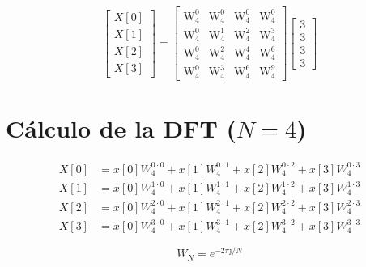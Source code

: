 \documentclass[12pt]{article}
\begin{document}
$$
\begin{bmatrix}
X[0] \\
X[1] \\
X[2] \\
X[3]
\end{bmatrix}
=
\begin{bmatrix}       
\text{W}_4^{0} & \text{W}_4^{0} & \text{W}_4^{0} & \text{W}_4^{0} \\
\text{W}_4^{0} & \text{W}_4^{1} & \text{W}_4^{2} & \text{W}_4^{3} \\
\text{W}_4^{0} & \text{W}_4^{2} & \text{W}_4^{4} & \text{W}_4^{6} \\
\text{W}_4^{0} & \text{W}_4^{3} & \text{W}_4^{6} & \text{W}_4^{9}
\end{bmatrix}
\begin{bmatrix}
3 \\
3 \\
3 \\
3
\end{bmatrix}
$$
\section*{Cálculo de la DFT ($N=4$)}

\begin{align*}
X[0] &= x[0]W_4^{0 \cdot 0} + x[1]W_4^{0 \cdot 1} + x[2]W_4^{0 \cdot 2} + x[3]W_4^{0 \cdot 3} \\
X[1] &= x[0]W_4^{1 \cdot 0} + x[1]W_4^{1 \cdot 1} + x[2]W_4^{1 \cdot 2} + x[3]W_4^{1 \cdot 3} \\
X[2] &= x[0]W_4^{2 \cdot 0} + x[1]W_4^{2 \cdot 1} + x[2]W_4^{2 \cdot 2} + x[3]W_4^{2 \cdot 3} \\
X[3] &= x[0]W_4^{3 \cdot 0} + x[1]W_4^{3 \cdot 1} + x[2]W_4^{3 \cdot 2} + x[3]W_4^{3 \cdot 3}
\end{align*}

\vspace{0.5cm}

\begin{equation*}
W_N = e^{-2\pi \text{j} / N}
\end{equation*}

\vspace{0.5cm}
\end{document}
